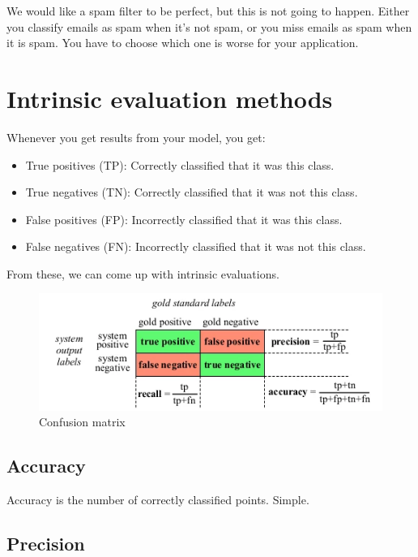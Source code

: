 \documentclass[
  11pt,
  british,
]{article}
\providecommand{\tightlist}{%
  \setlength{\itemsep}{0pt}\setlength{\parskip}{0pt}}
\begin{document}
We would like a spam filter to be perfect, but this is not going to
happen. Either you classify emails as spam when it's not spam, or you
miss emails as spam when it is spam. You have to choose which one is
worse for your application.

\hypertarget{intrinsic-evaluation-methods}{%
\section{Intrinsic evaluation
methods}\label{intrinsic-evaluation-methods}}

Whenever you get results from your model, you get:

\begin{itemize}
\tightlist
\item
  True positives (TP): Correctly classified that it was this class.
\item
  True negatives (TN): Correctly classified that it was not this class.
\item
  False positives (FP): Incorrectly classified that it was this class.
\item
  False negatives (FN): Incorrectly classified that it was not this
  class.
\end{itemize}

From these, we can come up with intrinsic evaluations.

\begin{figure}
\centering
\includegraphics{Pasted_image_20220216130019.png}
\caption{Confusion matrix}
\end{figure}

\hypertarget{accuracy}{%
\subsection{Accuracy}\label{accuracy}}

Accuracy is the number of correctly classified points. Simple.

\hypertarget{precision}{%
\subsection{Precision}\label{precision}}
\end{document}
